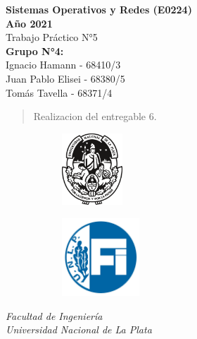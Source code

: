     \begin{titlepage}
        \begin{center}
            \vspace*{0.5cm}
            \huge
            \textbf{Sistemas Operativos y Redes (E0224) \\ Año 2021}    %
            \\
            \vspace{0.5cm}
            Trabajo Práctico N°5                                        %
            \\
            \vspace{2cm}
            \Large
            \textbf{Grupo N°4:}
            \\
            \large
            \vspace{0.2cm}
            Ignacio Hamann - 68410/3
            \\
            Juan Pablo Elisei - 68380/5
            \\
            Tomás Tavella - 68371/4
            \\
            \vspace{2cm}
            \begin{abstract}
                Realizacion del entregable 6.
            \end{abstract}
            \vfill
            \begin{figure}[H]
                \centering
                \begin{subfigure}
                    \centering
                    \includegraphics[width=0.25\textwidth]{Imagenes/UNLP.pdf}
                \end{subfigure}
                \begin{subfigure}
                    \centering
                    \includegraphics[width=0.32\textwidth]{Imagenes/FI.jpg}
                \end{subfigure}
            \end{figure}
            \vspace{1cm}
            \textit{
            Facultad de Ingeniería
            \\
            Universidad Nacional de La Plata}
            \vspace{1cm}
        \end{center}
    \end{titlepage}